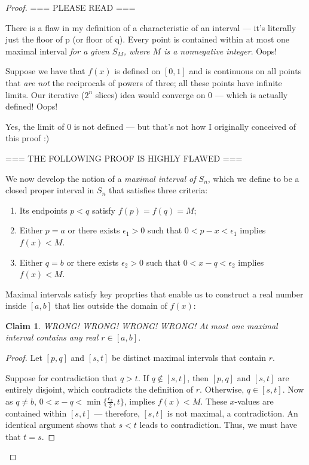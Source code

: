\documentclass[11pt]{article}
\newtheorem*{claim*}{Claim}
\begin{document}
\begin{proof}

=== PLEASE READ ===

There is a flaw in my definition of a characteristic of an interval --- it's literally just the floor of p (or floor of q). Every point is contained within at most one maximal interval \textit{for a given $S_M$, where $M$ is a nonnegative integer}. Oops!

Suppose we have that $f(x)$ is defined on $[0, 1]$ and is continuous on all points that \textit{are not} the reciprocals of powers of three; all these points have infinite limits. Our iterative ($2^n$ slices) idea would converge on $0$ --- which is actually defined! Oops!

Yes, the limit of $0$ is not defined --- but that's not how I originally conceived of this proof :)

=== THE FOLLOWING PROOF IS HIGHLY FLAWED ===

We now develop the notion of a \textit{maximal interval of $S_{n}$}, which we define to be a closed proper interval in $S_{n}$ that satisfies three criteria:

\begin{enumerate}
	\item Its endpoints $p < q$ satisfy $f(p) = f(q) = M$;
	\item Either $p = a$ or there exists $\epsilon_{1} > 0$ such that $0 < p - x < \epsilon_{1}$ implies $f(x) < M$.
	\item Either $q = b$ or there exists $\epsilon_{2} > 0$  such that $0 < x - q < \epsilon_{2}$ implies $f(x) < M$.
\end{enumerate}

Maximal intervals satisfy key proprties that enable us to construct a real number inside $[a, b]$ that lies outside the domain of $f(x)$:

\begin{adjustwidth}{1cm}{}
	\begin{claim*}
		WRONG! WRONG! WRONG! WRONG! At most one maximal interval contains any real $r \in [a, b]$.
	\end{claim*}
    \begin{proof}\renewcommand{\qedsymbol}{}
		Let $[p, q]$ and $[s, t]$ be distinct maximal intervals that contain $r$.

		Suppose for contradiction that $q > t$. If $q \notin [s, t]$, then $[p, q]$ and $[s, t]$ are entirely disjoint, which contradicts the definition of $r$. Otherwise, $q \in [s, t]$. Now as $q \ne b$, $0 < x - q < \min \{ \tfrac{\epsilon_{2}}{2}, t \}$, implies $f(x) < M$. These $x$-values are contained within $[s, t]$ --- therefore, $[s, t]$ is not maximal, a contradiction. An identical argument shows that $s < t$ leads to contradiction. Thus, we must have that $t = s$.



\end{proof}
\end{adjustwidth}
\end{proof}
\end{document}
